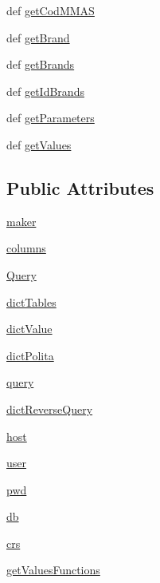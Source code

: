 \begin{DoxyCompactItemize}
\item 
def \hyperlink{classmmasgis_1_1dbQuery_1_1dbQuery_a45623da200110ec5ac4ec6b15710d096}{getCodMMAS}
\item 
def \hyperlink{classmmasgis_1_1dbQuery_1_1dbQuery_a44526f2de0edf74beaa2a9a831b94cdd}{getBrand}
\item 
def \hyperlink{classmmasgis_1_1dbQuery_1_1dbQuery_aa4dad3e81abc35d06df374ea4bde280b}{getBrands}
\item 
def \hyperlink{classmmasgis_1_1dbQuery_1_1dbQuery_a22c0f5952f1bba5d232634ef1bba9d48}{getIdBrands}
\item 
def \hyperlink{classmmasgis_1_1dbQuery_1_1dbQuery_a0c08984ecb71e1b09a1eb5b5869fbcad}{getParameters}
\item 
def \hyperlink{classmmasgis_1_1dbQuery_1_1dbQuery_adebedea3bac932b96424ceeb21c96b20}{getValues}
\end{DoxyCompactItemize}
\subsection*{Public Attributes}
\begin{DoxyCompactItemize}
\item 
\hyperlink{classmmasgis_1_1dbQuery_1_1dbQuery_a4144536fa0d400db085821297cc1bc59}{maker}
\item 
\hyperlink{classmmasgis_1_1dbQuery_1_1dbQuery_ab3ce7d0cc6523ebdfc8b77f8f61b4476}{columns}
\item 
\hyperlink{classmmasgis_1_1dbQuery_1_1dbQuery_af83031d9f8665589f8eb61a595c12353}{Query}
\item 
\hyperlink{classmmasgis_1_1dbQuery_1_1dbQuery_a75b09154678040948d1b523fd42580e9}{dictTables}
\item 
\hyperlink{classmmasgis_1_1dbQuery_1_1dbQuery_a150de96bb5d2ddcb2dfa8ec5519f6baf}{dictValue}
\item 
\hyperlink{classmmasgis_1_1dbQuery_1_1dbQuery_a4b5f0571ecf3f61805d15e0495f6ad4a}{dictPolita}
\item 
\hyperlink{classmmasgis_1_1dbQuery_1_1dbQuery_a873f380d103910d60fb184d9a556f083}{query}
\item 
\hyperlink{classmmasgis_1_1dbQuery_1_1dbQuery_a458de518694c77c7eae2b5d11c365d56}{dictReverseQuery}
\item 
\hyperlink{classmmasgis_1_1dbQuery_1_1dbQuery_ae5a0a461d19845757f012f093f679ece}{host}
\item 
\hyperlink{classmmasgis_1_1dbQuery_1_1dbQuery_a0623b120761fcb8043212d2056c076ca}{user}
\item 
\hyperlink{classmmasgis_1_1dbQuery_1_1dbQuery_ab429ceed5294b0a98e04497bde49ab13}{pwd}
\item 
\hyperlink{classmmasgis_1_1dbQuery_1_1dbQuery_a671c025c52b74671217a26df38b69c28}{db}
\item 
\hyperlink{classmmasgis_1_1dbQuery_1_1dbQuery_a1a9ff64f7ffe53d1ceef2503431936e1}{crs}
\item 
\hyperlink{classmmasgis_1_1dbQuery_1_1dbQuery_aeac214c5296a3c249c6c0105b7eeb489}{getValuesFunctions}
\end{DoxyCompactItemize}


